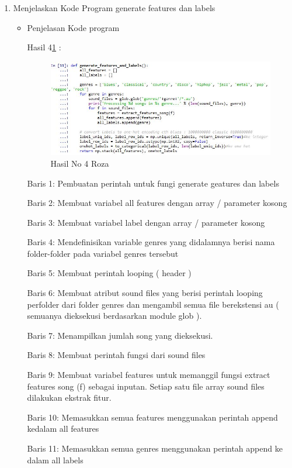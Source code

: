 \begin{enumerate}
\item Menjelaskan Kode Program generate features dan labels 
\begin{itemize}
\item Penjelasan Kode program

\par Hasil 4\ref{hasil4} :
\begin{figure}[!hbtp]
\centering
\includegraphics[scale=0.7]{figures/no4roza.jpg}
\caption{Hasil No 4 Roza}
\label{hasil4}
\end{figure}
\par Baris 1: Pembuatan perintah untuk fungi generate geatures dan labels
\par Baris 2: Membuat variabel all features dengan array / parameter kosong
\par Baris 3: Membuat variabel label dengan array / parameter kosong
\par Baris 4: Mendefinisikan variable genres yang didalamnya berisi nama folder-folder pada variabel genres tersebut
\par Baris 5: Membuat perintah looping ( header )
\par Baris 6: Membuat atribut sound files yang berisi perintah looping perfolder dari folder genres dan mengambil semua file berekstensi au ( semuanya dieksekusi berdasarkan module glob ).
\par Baris 7: Menampilkan jumlah song yang dieksekusi.
\par Baris 8: Membuat perintah fungsi dari sound files
\par Baris 9: Membuat variabel features untuk memanggil fungsi extract features song (f) sebagai inputan. Setiap satu file array sound files dilakukan ekstrak fitur.
\par Baris 10: Memasukkan semua features menggunakan perintah append kedalam all features
\par Baris 11: Memasukkan semua genres menggunakan perintah append ke dalam all labels

\end{itemize}
\end{enumerate}
